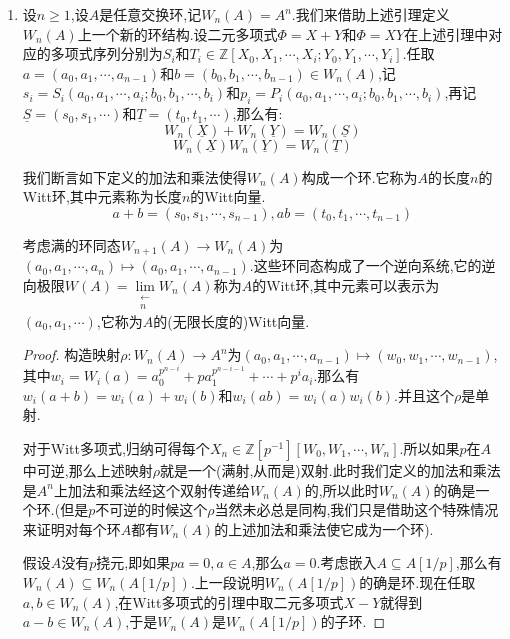 \begin{enumerate}
\begin{proof}
		按照归纳假设每个$\Phi_i(\underline{X}_i,\underline{Y}_i)\in\mathbb{Z}[\underline{X}_i,\underline{Y}_i],i\le n-1$,得到在$\mathrm{mod}p$下有$\Phi_i(\underline{X^p}_i,\underline{Y^p}_i)\equiv(\Phi_i(\underline{X}_i,\underline{Y}_i))^p$,于是在$\mathrm{mod}p^n$下就有$p^i\Phi_i(\underline{X^p}_i,\underline{Y^p}_i)^{p^{n-1-i}}\equiv p^i\Phi_i(\underline{X}_i,\underline{Y}_i)^{p^{n-i}}$.带入上述等式得证.
	\end{proof}
	\item 设$n\ge1$,设$A$是任意交换环,记$W_n(A)=A^n$.我们来借助上述引理定义$W_n(A)$上一个新的环结构.设二元多项式$\Phi=X+Y$和$\Phi=XY$在上述引理中对应的多项式序列分别为$S_i$和$T_i\in\mathbb{Z}[X_0,X_1,\cdots,X_i;Y_0,Y_1,\cdots,Y_i]$.任取$a=(a_0,a_1,\cdots,a_{n-1})$和$b=(b_0,b_1,\cdots,b_{n-1})\in W_n(A)$,记$s_i=S_i(a_0,a_1,\cdots,a_i;b_0,b_1,\cdots,b_i)$和$p_i=P_i(a_0,a_1,\cdots,a_i;b_0,b_1,\cdots,b_i)$,再记$\underline{S}=(s_0,s_1,\cdots)$和$\underline{T}=(t_0,t_1,\cdots)$,那么有:
	$$W_n(\underline{X})+W_n(\underline{Y})=W_n(\underline{S})$$
	$$W_n(\underline{X})W_n(\underline{Y})=W_n(\underline{T})$$
	
	我们断言如下定义的加法和乘法使得$W_n(A)$构成一个环.它称为$A$的长度$n$的Witt环,其中元素称为长度$n$的Witt向量.
	$$a+b=(s_0,s_1,\cdots,s_{n-1}),ab=(t_0,t_1,\cdots,t_{n-1})$$
	
	考虑满的环同态$W_{n+1}(A)\to W_n(A)$为$(a_0,a_1,\cdots,a_n)\mapsto(a_0,a_1,\cdots,a_{n-1})$.这些环同态构成了一个逆向系统,它的逆向极限$W(A)=\lim\limits_{\substack{\leftarrow\\n}}W_n(A)$称为$A$的Witt环,其中元素可以表示为$(a_0,a_1,\cdots)$,它称为$A$的(无限长度的)Witt向量.
	\begin{proof}
		
		构造映射$\rho:W_n(A)\to A^n$为$(a_0,a_1,\cdots,a_{n-1})\mapsto(w_0,w_1,\cdots,w_{n-1})$,其中$w_i=W_i(a)=a_0^{p^{n-i}}+pa_1^{p^{n-i-1}}+\cdots+p^ia_i$.那么有$w_i(a+b)=w_i(a)+w_i(b)$和$w_i(ab)=w_i(a)w_i(b)$.并且这个$\rho$是单射.
		
		\qquad
		
		对于Witt多项式,归纳可得每个$X_n\in\mathbb{Z}[p^{-1}][W_0,W_1,\cdots,W_n]$.所以如果$p$在$A$中可逆,那么上述映射$\rho$就是一个(满射,从而是)双射.此时我们定义的加法和乘法是$A^n$上加法和乘法经这个双射传递给$W_n(A)$的,所以此时$W_n(A)$的确是一个环.(但是$p$不可逆的时候这个$\rho$当然未必总是同构,我们只是借助这个特殊情况来证明对每个环$A$都有$W_n(A)$的上述加法和乘法使它成为一个环).
		
		\qquad
		
		假设$A$没有$p$挠元,即如果$pa=0,a\in A$,那么$a=0$.考虑嵌入$A\subseteq A[1/p]$,那么有$W_n(A)\subseteq W_n(A[1/p])$.上一段说明$W_n(A[1/p])$的确是环.现在任取$a,b\in W_n(A)$,在Witt多项式的引理中取二元多项式$X-Y$就得到$a-b\in W_n(A)$,于是$W_n(A)$是$W_n(A[1/p])$的子环.
		

\end{proof}
\end{enumerate}
